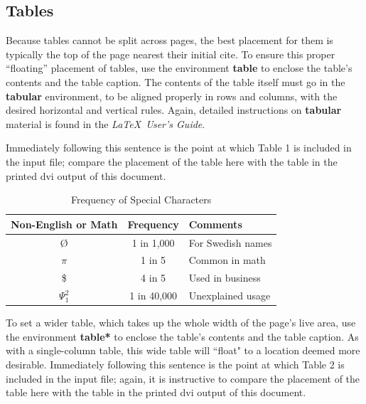 \documentclass{acm_proc_article-sp}
\begin{document}
%

%
%

\newpage

\subsection{Tables}
Because tables cannot be split across pages, the best
placement for them is typically the top of the page
nearest their initial cite.  To
ensure this proper ``floating'' placement of tables, use the
environment \textbf{table} to enclose the table's contents and
the table caption.  The contents of the table itself must go
in the \textbf{tabular} environment, to
be aligned properly in rows and columns, with the desired
horizontal and vertical rules.  Again, detailed instructions
on \textbf{tabular} material
is found in the \textit{\LaTeX\ User's Guide}.

Immediately following this sentence is the point at which
Table 1 is included in the input file; compare the
placement of the table here with the table in the printed
dvi output of this document.

\begin{table}
\centering
\caption{Frequency of Special Characters}
\begin{tabular}{|c|c|l|} \hline
Non-English or Math&Frequency&Comments\\ \hline
\O & 1 in 1,000& For Swedish names\\ \hline
$\pi$ & 1 in 5& Common in math\\ \hline
\$ & 4 in 5 & Used in business\\ \hline
$\Psi^2_1$ & 1 in 40,000& Unexplained usage\\
\hline\end{tabular}
\end{table}

To set a wider table, which takes up the whole width of
the page's live area, use the environment
\textbf{table*} to enclose the table's contents and
the table caption.  As with a single-column table, this wide
table will ``float" to a location deemed more desirable.
Immediately following this sentence is the point at which
Table 2 is included in the input file; again, it is
instructive to compare the placement of the
table here with the table in the printed dvi
output of this document.
\end{document}
